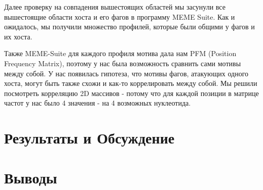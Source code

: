 \documentclass[a4paper,12pt]{article}
\begin{document}
\par{Далее проверку на совпадения вышестоящих областей мы засунули все вышестоящие области хоста и его фагов в программу
MEME Suite. Как и ожидалось, мы получили множество профилей, которые были общими у фагов и их хоста. }

\par{Также MEME-Suite для каждого профиля мотива дала нам PFM (Position Frequency Matrix), поэтому у нас была возможность
сравнить сами мотивы между собой. У нас появилась гипотеза, что мотивы фагов, атакующих одного хоста, могут быть также
схожи и как-то коррелировать между собой. Мы решили посмотреть корреляцию 2D массивов - потому что для каждой позиции в
матрице частот у нас было 4 значения - на 4 возможных нуклеотида.}

\newpage
\section{Результаты и Обсуждение}

\newpage
\section{Выводы}
\end{document}
